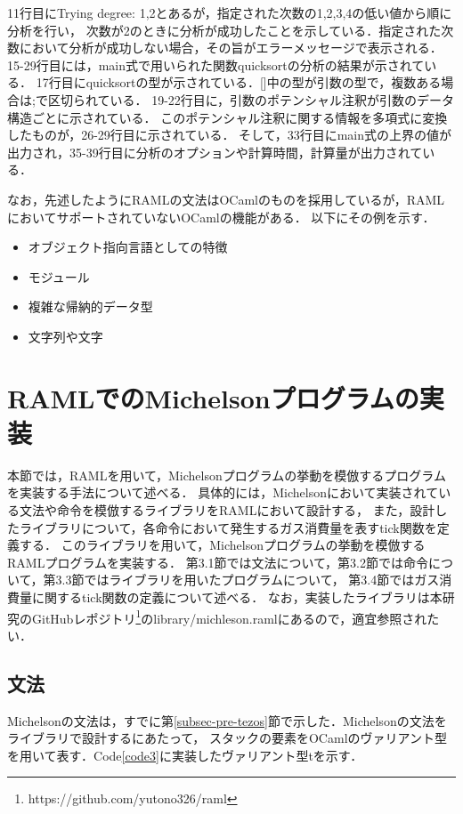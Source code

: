 \documentclass{kuisthesis}
\begin{document}
11行目にTrying degree: 1,2とあるが，指定された次数の1,2,3,4の低い値から順に分析を行い，
次数が2のときに分析が成功したことを示している．指定された次数において分析が成功しない場合，その旨がエラーメッセージで表示される．
15-29行目には，main式で用いられた関数quicksortの分析の結果が示されている．
17行目にquicksortの型が示されている．[]中の型が引数の型で，複数ある場合は;で区切られている．
19-22行目に，引数のポテンシャル注釈が引数のデータ構造ごとに示されている．
このポテンシャル注釈に関する情報を多項式に変換したものが，26-29行目に示されている．
そして，33行目にmain式の上界の値が出力され，35-39行目に分析のオプションや計算時間，計算量が出力されている．

なお，先述したようにRAMLの文法はOCamlのものを採用しているが，RAMLにおいてサポートされていないOCamlの機能がある．
以下にその例を示す．
\begin{itemize}
  \item オブジェクト指向言語としての特徴
  \item モジュール
  \item 複雑な帰納的データ型
  \item 文字列や文字
\end{itemize}


\section{RAMLでのMichelsonプログラムの実装} \label{sec-program}
本節では，RAMLを用いて，Michelsonプログラムの挙動を模倣するプログラムを実装する手法について述べる．
具体的には，Michelsonにおいて実装されている文法や命令を模倣するライブラリをRAMLにおいて設計する，
また，設計したライブラリについて，各命令において発生するガス消費量を表すtick関数を定義する．
このライブラリを用いて，Michelsonプログラムの挙動を模倣するRAMLプログラムを実装する．
第3.1節では文法について，第3.2節では命令について，第3.3節ではライブラリを用いたプログラムについて，
第3.4節ではガス消費量に関するtick関数の定義について述べる．
なお，実装したライブラリは本研究のGitHubレポジトリ\footnote{https://github.com/yutono326/raml}のlibrary/michleson.ramlにあるので，適宜参照されたい．

\subsection{文法} \label{subsec-pro-grammar}
Michelsonの文法は，すでに第\ref{subsec-pre-tezos}節で示した．Michelsonの文法をライブラリで設計するにあたって，
スタックの要素をOCamlのヴァリアント型を用いて表す．Code\ref{code3}に実装したヴァリアント型tを示す．
\end{document}
